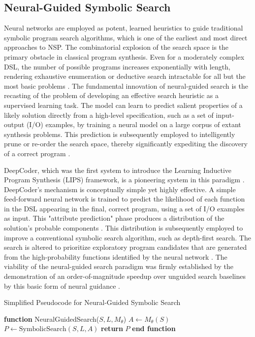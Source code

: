 \documentclass[12pt, a4paper]{report}
\begin{document}
\subsection{Neural-Guided Symbolic Search}
Neural networks are employed as potent, learned heuristics to guide traditional symbolic program search algorithms, which is one of the earliest and most direct approaches to NSP. The combinatorial explosion of the search space is the primary obstacle in classical program synthesis. Even for a moderately complex DSL, the number of possible programs increases exponentially with length, rendering exhaustive enumeration or deductive search intractable for all but the most basic problems \citep{devlin2017robustfill}. The fundamental innovation of neural-guided search is the recasting of the problem of developing an effective search heuristic as a supervised learning task. The model can learn to predict salient properties of a likely solution directly from a high-level specification, such as a set of input-output (I/O) examples, by training a neural model on a large corpus of extant synthesis problems. This prediction is subsequently employed to intelligently prune or re-order the search space, thereby significantly expediting the discovery of a correct program \citep{zhang2018neural}. 

DeepCoder, which was the first system to introduce the Learning Inductive Program Synthesis (LIPS) framework, is a pioneering system in this paradigm \citep{balog2017deepcoder}. DeepCoder's mechanism is conceptually simple yet highly effective. A simple feed-forward neural network is trained to predict the likelihood of each function in the DSL appearing in the final, correct program, using a set of I/O examples as input. This "attribute prediction" phase produces a distribution of the solution's probable components \citep{devlin2017robustfill}. This distribution is subsequently employed to improve a conventional symbolic search algorithm, such as depth-first search. The search is altered to prioritize exploratory program candidates that are generated from the high-probability functions identified by the neural network \citep{balog2017deepcoder}. The viability of the neural-guided search paradigm was firmly established by the demonstration of an order-of-magnitude speedup over unguided search baselines by this basic form of neural guidance \citep{devlin2017robustfill}.

\begin{algorithm}
\caption{Simplified Pseudocode for Neural-Guided Symbolic Search}
\label{alg:neural_guided_search}
\begin{algorithmic}[1]
\STATE \textbf{function} NeuralGuidedSearch($S, L, M_{\theta}$)
\STATE \quad {}
\STATE \quad $A \leftarrow M_{\theta}(S)$
\STATE
\STATE \quad {}
\STATE \quad $P \leftarrow \text{SymbolicSearch}(S, L, A)$
\STATE
\STATE \quad \textbf{return} $P$
\STATE \textbf{end function}
\end{algorithmic}
\end{algorithm}
\end{document}
